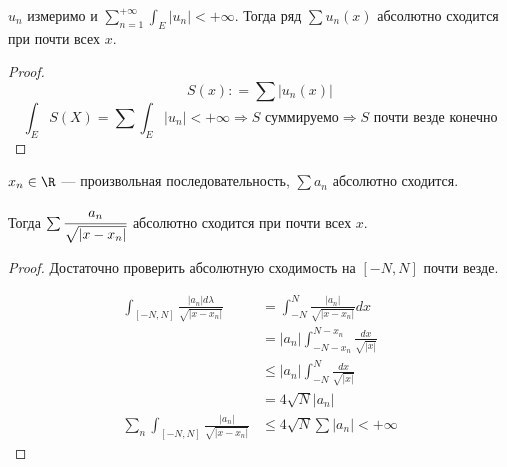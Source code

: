 \begin{corollary}
    \(u_n\) измеримо и
    \(\sum\limits_{n = 1}^{+\infty} \int_E |u_n| < +\infty\). Тогда ряд \(\sum u_n(x)\) абсолютно сходится при почти всех \(x\).
\end{corollary}
\begin{proof}
    \[S(x) : = \sum |u_n(x)|\]
    \[\int_E S(X) = \sum \int_E |u_n|< +\infty \Rightarrow S \text{ суммируемо} \Rightarrow S \text{ почти везде конечно}\]
\end{proof}

\begin{example}
    \(x_n\in\R\) --- произвольная последовательность, \(\sum a_n\) абсолютно сходится.

    Тогда \(\sum \cfrac{a_n}{\sqrt{|x - x_n|}}\) абсолютно сходится при почти всех \(x\).
\end{example}
\begin{proof}
    Достаточно проверить абсолютную сходимость на \([ - N, N]\) почти везде.

    \begin{align*}
        \int_{[ - N, N]} \frac{|a_n| d\lambda}{\sqrt{|x - x_n|}}
         & = \int_{ - N}^N \frac{|a_n|}{\sqrt{|x - x_n|}} dx        \\
         & = |a_n|\int_{ - N - x_n}^{N - x_n} \frac{dx}{\sqrt{|x|}} \\
         & \leq |a_n|\int_{ - N}^{N} \frac{dx}{\sqrt{|x|}}          \\
         & = 4 \sqrt{N} |a_n|                                       \\
         \sum_n\int_{[ - N, N]} \frac{|a_n|}{\sqrt{|x - x_n|}}
         & \leq 4 \sqrt{N} \sum|a_n| < +\infty
    \end{align*}
\end{proof}